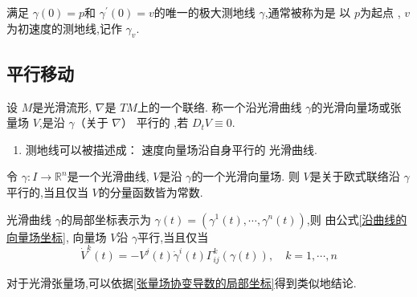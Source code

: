 \documentclass[../../几何与拓扑.tex]{subfiles}
\begin{document}
\hspace*{\fill} 


\begin{definition}
    满足 \(   \gamma \left( 0 \right)= p   \)和 \(  \gamma ^{\prime} \left( 0 \right)= v   \)的唯一的极大测地线 \(   \gamma   \),通常被称为是 
    以 \(  p  \)为起点 , \(  v  \)为初速度的测地线,记作 \(   \gamma _{v}  \).      
\end{definition}


\subsection{平行移动}

\begin{definition}
    设 \(  M  \)是光滑流形, \(   \nabla   \)是 \(  TM  \)上的一个联络.
    称一个沿光滑曲线 \(   \gamma   \)的光滑向量场或张量场 \(  V  \),是沿 \(   \gamma   \)（关于 \(   \nabla   \)） 平行的       ,若 \(  D_{t}V \equiv 0  \). 
\end{definition}

\begin{remark}
    \begin{enumerate}
        \item 测地线可以被描述成： 速度向量场沿自身平行的 光滑曲线.
    \end{enumerate}
    
\end{remark}
\begin{example}
    令 \(   \gamma :I\to \mathbb{R} ^{n}  \)是一个光滑曲线, \(  V  \)是沿 \(   \gamma   \)的一个光滑向量场.
    则 \(  V  \)是关于欧式联络沿 \(   \gamma   \)平行的,当且仅当 \(  V  \)的分量函数皆为常数.      
\end{example}

\hspace*{\fill} 

\begin{proposition}
    光滑曲线 \(   \gamma   \)的局部坐标表示为 \(   \gamma \left( t \right) =  \left(  \gamma ^{1}\left( t \right),\cdots , \gamma ^{n}\left( t \right)   \right)    \),则
    由公式\ref{沿曲线的向量场坐标},
    向量场 \(  V  \)沿 \(   \gamma   \)平行,当且仅当 \[
    \dot{V}^{k}\left( t \right) =  -V^{j}\left( t \right)  \dot{\gamma}^{i}\left( t \right) \Gamma _{ij}^{k}\left(  \gamma \left( t \right)  \right)    ,\quad  k=  1,\cdots,n 
    \]     
\end{proposition}

\begin{remark}
    对于光滑张量场,可以依据\ref{张量场协变导数的局部坐标}得到类似地结论.
\end{remark}
\end{document}
